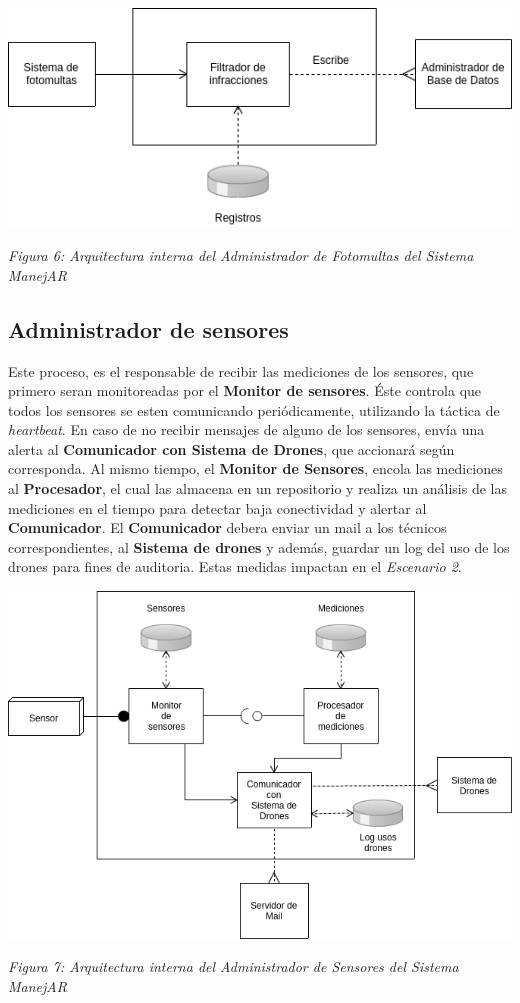 \centerline{\includegraphics[width=1\textwidth]{./imagenes/arquitectura_tp2/administrador_fotomultas.png}}
\centerline{\textit{Figura 6: Arquitectura interna del Administrador de Fotomultas del Sistema ManejAR}}


\subsection{Administrador de sensores}
Este proceso, es el responsable de recibir las mediciones de los sensores, que 
primero seran monitoreadas por el \textbf{Monitor de sensores}. Éste controla que todos
los sensores se esten comunicando periódicamente, utilizando la táctica de
\textit{heartbeat}. En caso de no recibir mensajes de alguno de los sensores, envía una
alerta al \textbf{Comunicador con Sistema de Drones}, que accionará según corresponda.
Al mismo tiempo, el \textbf{Monitor de Sensores}, encola las mediciones al \textbf{Procesador}, el
cual las almacena en un repositorio y realiza un análisis de las mediciones en
el tiempo para detectar baja conectividad y alertar al \textbf{Comunicador}.
El \textbf{Comunicador} debera enviar un mail a los técnicos correspondientes, al \textbf{Sistema 
de drones} y además, guardar un log del uso de los drones para fines de auditoria.
Estas medidas impactan en el \textit{Escenario 2}.



\centerline{\includegraphics[width=1\textwidth]{./imagenes/arquitectura_tp2/administrador_sensores.png}}
\centerline{\textit{Figura 7: Arquitectura interna del Administrador de Sensores del Sistema ManejAR}}


